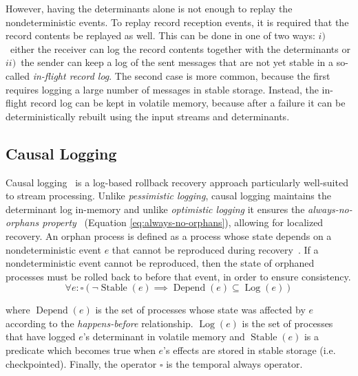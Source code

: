 \documentclass[sigconf]{acmart}
\DeclareMathOperator{\Stable}{Stable}
\DeclareMathOperator{\Depend}{Depend}
\DeclareMathOperator{\Log}{Log}
\begin{document}
However, having the determinants alone is not enough to replay the nondeterministic events. To replay record reception events, it is required that the record contents be replayed as well. This can be done in one of two ways: $i)$~either the receiver can log the record contents together with the determinants or $ii)$~the sender can keep a log of the sent messages that are not yet stable in a so-called \textit{in-flight record log}. The second case is more common, because the first requires logging a large number of messages in stable storage.
Instead, the in-flight record log can be kept in volatile memory,
because after a failure it can be deterministically rebuilt using the
input streams and determinants.

\subsection{Causal Logging}
\label{sec:causal_logging}

Causal logging~\cite{alvisi1998message, elnozahy1994manetho} is a log-based rollback recovery approach particularly well-suited to stream processing. 
Unlike \textit{pessimistic logging}, causal logging maintains the determinant log in-memory and unlike
\textit{optimistic logging} it ensures the \textit{always-no-orphans property}~\cite{alvisi1996understanding} (Equation \ref{eq:always-no-orphans}), allowing for localized recovery.
An orphan process is defined as a process whose state depends on a nondeterministic event $e$ that cannot be reproduced during recovery~\cite{elnozahy2002survey}. 
If a nondeterministic event cannot be reproduced, then the state of orphaned processes must be rolled back to before that event, in order to ensure consistency.
\begin{equation}\label{eq:always-no-orphans}
  \forall e: \square(\neg \Stable(e) \implies \Depend(e) \subseteq \Log(e))
\end{equation}

\noindent where $\Depend(e)$ is the set of processes whose state was affected by $e$ according to the \textit{happens-before} relationship. $\Log(e)$ is the set of processes that have logged $e$'s determinant in volatile memory and $\Stable(e)$ is a predicate which becomes true when $e$'s effects are stored in stable storage (i.e. checkpointed). Finally, the operator $\square$ is the temporal always operator. %
\end{document}
